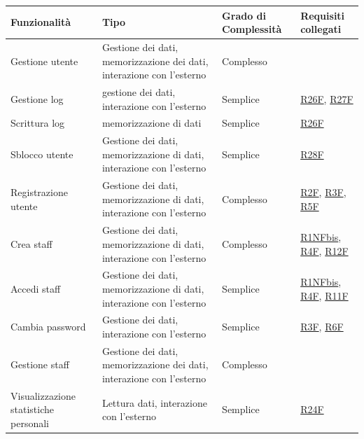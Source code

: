 \documentclass[a4paper]{article}
\begin{document}
\begin{center}
    \begin{tabularx}{1\textwidth}{|X|X|X|X|}
        \hline
        \textbf{Funzionalità} & \textbf{Tipo} & \textbf{Grado di Complessità} & \textbf{Requisiti collegati}\\
        \hline
        \hline
        Gestione utente & Gestione dei dati, memorizzazione dei dati, interazione con l'esterno & Complesso & \\
        \hline
        Gestione log & gestione dei dati, interazione con l'esterno & Semplice & \hyperlink{R26F}{R26F}, \hyperlink{R27F}{R27F}\\
        \hline
        Scrittura log & memorizzazione di dati & Semplice & \hyperlink{R26F}{R26F}\\
        \hline
        Sblocco utente & Gestione dei dati, memorizzazione di dati, interazione con l'esterno & Semplice & \hyperlink{R28F}{R28F}\\
        \hline
        Registrazione utente & Gestione dei dati, memorizzazione di dati, interazione con l'esterno & Complesso & \hyperlink{R2F}{R2F}, \hyperlink{R3F}{R3F}, \hyperlink{R5F}{R5F} \\
        \hline
        Crea staff & Gestione dei dati, memorizzazione di dati, interazione con l'esterno & Complesso & \hyperlink{R1NFbis}{R1NFbis}, \hyperlink{R4F}{R4F}, \hyperlink{R12F}{R12F}\\
        \hline
        Accedi staff & Gestione dei dati, memorizzazione di dati, interazione con l'esterno & Semplice & \hyperlink{R1NFbis}{R1NFbis}, \hyperlink{R4F}{R4F}, \hyperlink{R11F}{R11F} \\
        \hline
        Cambia password & Gestione dei dati, interazione con l'esterno & Semplice & \hyperlink{R3F}{R3F}, \hyperlink{R6F}{R6F} \\
        \hline
        Gestione staff & Gestione dei dati, memorizzazione dei dati, interazione con l'esterno & Complesso &  \\
        \hline
        Visualizzazione statistiche personali & Lettura dati, interazione con l'esterno & Semplice &  \hyperlink{R24F}{R24F} \\
        \hline

\end{tabularx}
\end{center}
\end{document}
